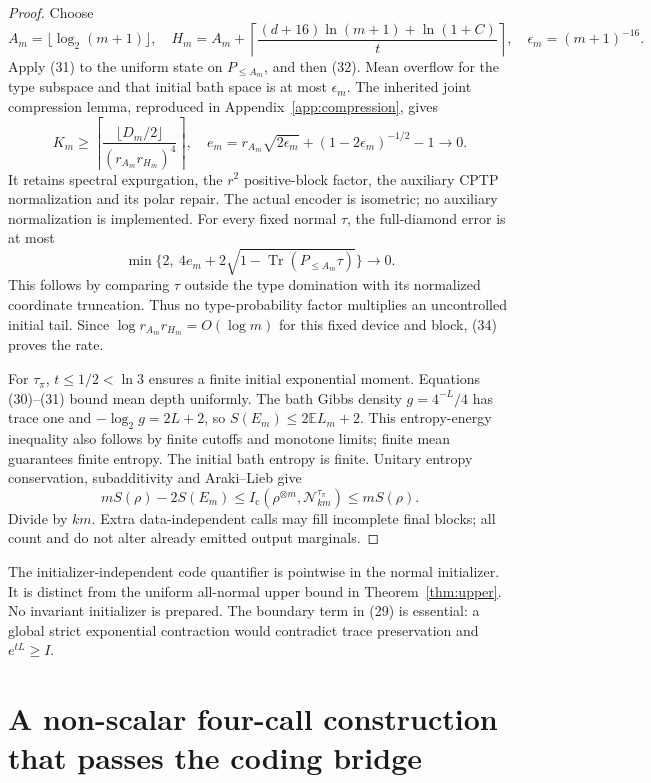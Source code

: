 \documentclass[11pt]{article}
\newcommand{\Tr}{\operatorname{Tr}}
\newcommand{\E}{\mathbb E}
\newcommand{\Ic}{I_{\mathrm c}}
\begin{document}
\begin{proof}
Choose
\[
 A_m=\lfloor\log_2(m+1)\rfloor,\quad
 H_m=A_m+\left\lceil
 \frac{(d+16)\ln(m+1)+\ln(1+C)}t\right\rceil,\quad
 \epsilon_m=(m+1)^{-16}.
 \tag{33}
\]
Apply (31) to the uniform state on $P_{\le A_m}$, and then (32).
Mean overflow for the type subspace and that initial bath space is at
most $\epsilon_m$. The inherited joint compression lemma, reproduced
in Appendix~\ref{app:compression}, gives
\[
 K_m\ge\left\lceil
 \frac{\lfloor D_m/2\rfloor}{(r_{A_m}r_{H_m})^4}
 \right\rceil,\quad
 e_m=r_{A_m}\sqrt{2\epsilon_m}+(1-2\epsilon_m)^{-1/2}-1\to0.
 \tag{34}
\]
It retains spectral expurgation, the $r^2$ positive-block factor,
the auxiliary CPTP normalization and its polar repair.
The actual encoder is isometric; no auxiliary normalization is implemented.
For every fixed normal $\tau$, the full-diamond error is at most
\[
 \min\{2,\ 4e_m+2\sqrt{1-\Tr(P_{\le A_m}\tau)}\}\longrightarrow0.
 \tag{35}
\]
This follows by comparing $\tau$ outside the type domination with its
normalized coordinate truncation. Thus no type-probability factor multiplies
an uncontrolled initial tail. Since $\log r_{A_m}r_{H_m}=O(\log m)$
for this fixed device and block, (34) proves the rate.

For $\tau_\pi$, $t\le1/2<\ln3$ ensures a finite initial exponential
moment. Equations (30)--(31) bound mean depth uniformly. The bath Gibbs
density $g=4^{-L}/4$ has trace one and
$-\log_2g=2L+2$, so $S(E_m)\le2\E L_m+2$.
This entropy-energy inequality also follows by finite cutoffs and monotone
limits; finite mean guarantees finite entropy. The initial bath entropy
is finite. Unitary entropy conservation, subadditivity and Araki--Lieb give
\[
 mS(\rho)-2S(E_m)\le\Ic(\rho^{\otimes m},\mathcal N_{km}^{\tau_\pi})
 \le mS(\rho).
 \tag{36}
\]
Divide by $km$. Extra data-independent calls may fill incomplete final
blocks; all count and do not alter already emitted output marginals.
\end{proof}

The initializer-independent code quantifier is pointwise in the normal initializer.
It is distinct from the uniform all-normal upper bound in Theorem~\ref{thm:upper}.
No invariant initializer is prepared. The boundary term in (29) is essential:
a global strict exponential contraction would contradict trace preservation
and $e^{tL}\ge I$.

\section{A non-scalar four-call construction that passes the coding bridge}
\end{document}
